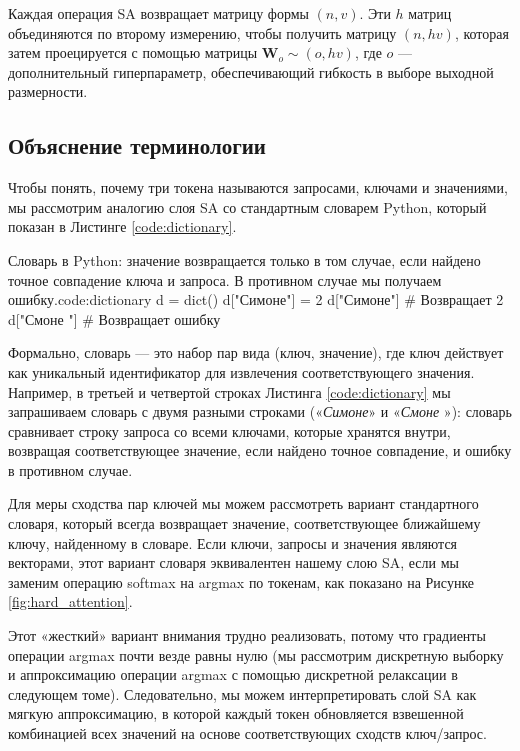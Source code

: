 \vspace{0.5em}
Каждая операция SA возвращает матрицу формы $(n,v)$. Эти $h$ матриц объединяются по второму измерению, чтобы получить матрицу $(n,hv)$, которая затем проецируется с помощью матрицы $\mathbf{W}_o \sim (o,hv)$, где $o$ — дополнительный гиперпараметр, обеспечивающий гибкость в выборе выходной размерности.

\subsection*{Объяснение терминологии} 

Чтобы понять, почему три токена называются запросами, ключами и значениями, \addteacup мы рассмотрим аналогию слоя SA со стандартным словарем Python, который показан в Листинге \ref{code:dictionary}. 

\begin{mypy}{Словарь в Python: значение возвращается только в том случае, если найдено точное совпадение ключа и запроса. В противном случае мы получаем ошибку.}{code:dictionary}
d = dict()
d["Симоне"] = 2
d["Симоне"]       # Возвращает 2
d["Смоне "]       # Возвращает ошибку
\end{mypy}

Формально, словарь — это набор пар вида (ключ, значение), где ключ действует как уникальный идентификатор для извлечения соответствующего значения. Например, в третьей и четвертой строках Листинга \ref{code:dictionary} мы запрашиваем словарь с двумя разными строками («\textit{Симоне}» и «\textit{Смоне }»): словарь сравнивает строку запроса со всеми ключами, которые хранятся внутри, возвращая соответствующее значение, если найдено точное совпадение, и ошибку в противном случае.

Для меры сходства пар ключей мы можем рассмотреть вариант стандартного словаря, который всегда возвращает значение, соответствующее ближайшему ключу, найденному в словаре. Если ключи, запросы и значения являются векторами, этот вариант словаря эквивалентен нашему слою SA, если мы заменим операцию softmax на argmax по токенам, как показано на Рисунке \ref{fig:hard_attention}.

Этот «жесткий» вариант внимания трудно реализовать, потому что градиенты операции argmax почти везде равны нулю (мы рассмотрим дискретную выборку и аппроксимацию операции argmax с помощью дискретной релаксации в следующем томе). Следовательно, мы можем интерпретировать слой SA как мягкую аппроксимацию, в которой каждый токен обновляется взвешенной комбинацией всех значений на основе соответствующих сходств ключ/запрос.

